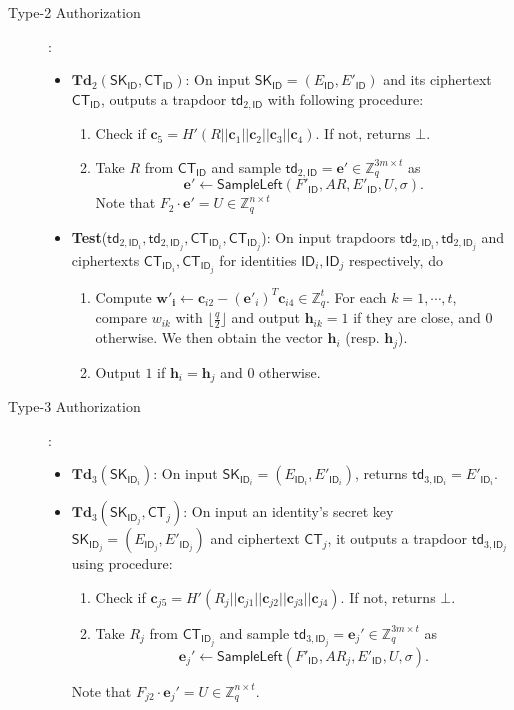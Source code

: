 \documentclass[runningheads,10pt]{llncs}
\def\ZZ{\mathbb{Z}}
\def\bf{\mathbf}
\def\SK{\mathsf{SK}}
\def\CT{\mathsf{CT}}
\def\SampleLeft{\mathsf{SampleLeft}}
\def\td{\mathsf{td}}
\def\e{\bf{e}}
\def\c{\bf{c}}
\def\ID{\mathsf{ID}}
\begin{document}
\begin{description}
	\item[Type-2 Authorization]:
	\begin{itemize}
		\item $\textbf{Td}_2(\SK_\ID, \CT_\ID)$: On input $\SK_\ID=(E_\ID,E'_\ID)$ and its ciphertext $\CT_\ID$, outputs a trapdoor $\td_{2,\ID}$ with following procedure:
		\begin{enumerate}
			\item Check if $\c_5=H'(R||\c_{1}||\c_{2}||\c_{3}||\c_{4})$. If not, returns $\bot$.
			\item Take $R$ from $\CT_{\ID}$ and sample $\td_{2,\ID} = \e'\in\ZZ_q^{3m\times t}$ as
			$$\e'\gets\SampleLeft(F'_\ID,AR,E'_\ID,U,\sigma).$$
			Note that $F_2\cdot\e'=U\in\ZZ_q^{n\times t}$
		\end{enumerate}
		\item \textbf{Test}($\td_{2,\ID_i},\td_{2,\ID_j},\CT_{\ID_i},\CT_{\ID_j}$): On input trapdoors $\td_{2,\ID_i}, \td_{2,\ID_j}$ and ciphertexts
		$\CT_{\ID_i},\CT_{\ID_j}$ for identities $\ID_i, \ID_j$ respectively, do 
		\begin{enumerate}
			\item Compute $\bf{w'_i}\gets\c_{i2}-(\e'_i)^T\c_{i4}\in\ZZ_q^t$. For each $k=1,\cdots, t$, compare $w_{ik}$ with $\lfloor\frac{q}{2}\rfloor$ and output $\bf{h}_{ik}=1$ if they are close, and $0$ otherwise. We then obtain the vector $\bf{h}_i$ (resp. $\bf{h}_j$).
			\item Output $1$ if  $\bf{h}_i=\bf{h}_j$ and $0$ otherwise.
		\end{enumerate}
	\end{itemize}
	
	\item[Type-3 Authorization]:
	\begin{itemize}
		\item $\textbf{Td}_3(\SK_{\ID_i})$: On input $\SK_{\ID_i}=(E_{\ID_i},E'_{\ID_i})$, returns $\td_{3,{\ID_i}}=E'_{\ID_i}$.
		\item $\textbf{Td}_3(\SK_{\ID_j}, \CT_j)$: On input an identity's secret key $\SK_{\ID_j}=(E_{\ID_j},E'_{\ID_j})$ and ciphertext $\CT_j$, it outputs a trapdoor $\td_{3,{\ID_j}}$ using procedure:
		\begin{enumerate}
			\item Check if $\c_{j5}=H'(R_j||\c_{j1}||\c_{j2}||\c_{j3}||\c_{j4})$. If not, returns $\bot$.
			\item Take $R_j$ from $\CT_{\ID_j}$ and sample $\td_{3,{\ID_j}} = \e_j'\in\ZZ_q^{3m\times t}$ as
			$$\e_j'\gets\SampleLeft(F'_\ID,AR_j,E'_\ID,U,\sigma).$$
		\end{enumerate}
		Note that $F_{j2}\cdot\e_j'=U\in\ZZ_q^{n\times t}$.
		

\end{itemize}
\end{description}
\end{document}
